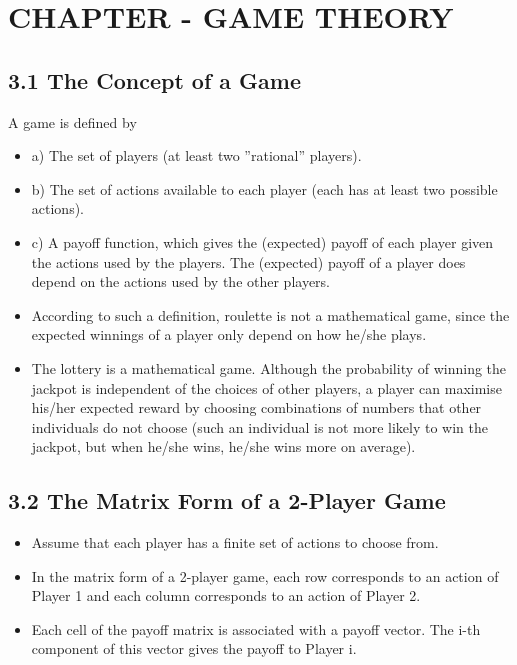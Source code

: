 \documentclass[]{report}
\begin{document}
	

\chapter{CHAPTER - GAME THEORY}
\section{3.1 The Concept of a Game}
A game is defined by
\begin{itemize}
	\item a) The set of players (at least two ”rational” players).
	\item b) The set of actions available to each player (each has at least
	two possible actions).
	\item c) A payoff function, which gives the (expected) payoff of each
	player given the actions used by the players. The (expected) payoff
	of a player does depend on the actions used by the other players.
\end{itemize}


\begin{itemize}
	\item According to such a definition, roulette is not a mathematical
	game, since the expected winnings of a player only depend on how
	he/she plays.
	\item The lottery is a mathematical game. Although the probability of
	winning the jackpot is independent of the choices of other players,
	a player can maximise his/her expected reward by choosing
	combinations of numbers that other individuals do not choose
	(such an individual is not more likely to win the jackpot, but when
	he/she wins, he/she wins more on average).
\end{itemize}


\section{3.2 The Matrix Form of a 2-Player Game}
\begin{itemize}
	\item Assume that each player has a finite set of actions to choose from.
	\item In the matrix form of a 2-player game, each row corresponds to an
	action of Player 1 and each column corresponds to an action of
	Player 2.
	\item Each cell of the payoff matrix is associated with a payoff vector.
	The i-th component of this vector gives the payoff to Player i.
\end{itemize}
\end{document}
